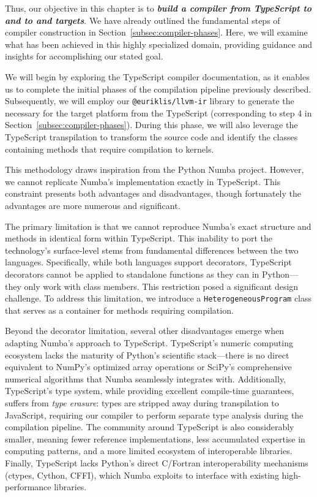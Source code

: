 Thus, our objective in this chapter is to \textit{\textbf{build a compiler from TypeScript to   and to  and  targets}}. We have already outlined the fundamental steps of compiler construction in Section~\ref{subsec:compiler-phases}. Here, we will examine what has been achieved in this highly specialized domain, providing guidance and insights for accomplishing our stated goal.

We will begin by exploring the TypeScript compiler  documentation, as it enables us to complete the initial phases of the compilation pipeline previously described. Subsequently, we will employ our \texttt{@euriklis/llvm-ir} library to generate the necessary   for the target platform from the TypeScript  (corresponding to step 4 in Section~\ref{subsec:compiler-phases}). During this phase, we will also leverage the TypeScript transpilation  to transform the source code and identify the classes containing methods that require compilation to  kernels.

This methodology draws inspiration from the Python Numba project. However, we cannot replicate Numba's implementation exactly in TypeScript. This constraint presents both advantages and disadvantages, though fortunately the advantages are more numerous and significant.

The primary limitation is that we cannot reproduce Numba's exact structure and methods in identical form within TypeScript. This inability to port the technology's surface-level  stems from fundamental differences between the two languages. Specifically, while both languages support decorators, TypeScript decorators cannot be applied to standalone functions as they can in Python---they only work with class members. This restriction posed a significant design challenge. To address this limitation, we introduce a \texttt{HeterogeneousProgram} class that serves as a container for methods requiring  compilation.

Beyond the decorator limitation, several other disadvantages emerge when adapting Numba's approach to TypeScript. TypeScript's numeric computing ecosystem lacks the maturity of Python's scientific stack---there is no direct equivalent to NumPy's optimized array operations or SciPy's comprehensive numerical algorithms that Numba seamlessly integrates with. Additionally, TypeScript's type system, while providing excellent compile-time guarantees, suffers from \textit{type erasure}: types are stripped away during transpilation to JavaScript, requiring our compiler to perform separate type analysis during the compilation pipeline. The  community around TypeScript is also considerably smaller, meaning fewer reference implementations, less accumulated expertise in  computing patterns, and a more limited ecosystem of interoperable libraries. Finally, TypeScript lacks Python's direct C/Fortran interoperability mechanisms (ctypes, Cython, CFFI), which Numba exploits to interface with existing high-performance libraries.

